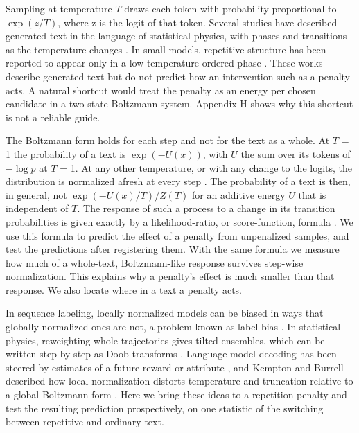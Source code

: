 \documentclass[aps,prx,onecolumn,superscriptaddress,longbibliography]{revtex4-2}
\begin{document}
Sampling at temperature \(T\) draws each token with probability proportional to \(\exp(z/T)\), where z is the logit of that token. Several studies have described generated text in the language of statistical physics, with phases and transitions as the temperature changes \cite{2406.05335,2503.06330,2405.17088,2606.06238}. In small models, repetitive structure has been reported to appear only in a low-temperature ordered phase \cite{2406.05335,2503.06330}. These works describe generated text but do not predict how an intervention such as a penalty acts. A natural shortcut would treat the penalty as an energy per chosen candidate in a two-state Boltzmann system. Appendix H shows why this shortcut is not a reliable guide.

The Boltzmann form holds for each step and not for the text as a whole. At \(T\) = 1 the probability of a text is \(\exp(-U(x))\), with \(U\) the sum over its tokens of \(-\log p\) at \(T\) = 1. At any other temperature, or with any change to the logits, the distribution is normalized afresh at every step \cite{2503.21929}. The probability of a text is then, in general, not \(\exp(-U(x)/T)/Z(T)\) for an additive energy \(U\) that is independent of \(T\). The response of such a process to a change in its transition probabilities is given exactly by a likelihood-ratio, or score-function, formula \cite{Glynn1990,Williams1992,WarrenAllen2012}. We use this formula to predict the effect of a penalty from unpenalized samples, and test the predictions after registering them. With the same formula we measure how much of a whole-text, Boltzmann-like response survives step-wise normalization. This explains why a penalty's effect is much smaller than that response. We also locate where in a text a penalty acts.

In sequence labeling, locally normalized models can be biased in ways that globally normalized ones are not, a problem known as label bias \cite{LaffertyEtAl2001,AndorEtAl2016,WisemanRush2016}. In statistical physics, reweighting whole trajectories gives tilted ensembles, which can be written step by step as Doob transforms \cite{GarrahanEtAl2009,JackSollich2010,ChetriteTouchette2015}. Language-model decoding has been steered by estimates of a future reward or attribute \cite{YangKlein2021,ZhaoEtAl2024}, and Kempton and Burrell described how local normalization distorts temperature and truncation relative to a global Boltzmann form \cite{2503.21929}. Here we bring these ideas to a repetition penalty and test the resulting prediction prospectively, on one statistic of the switching between repetitive and ordinary text.
\end{document}
